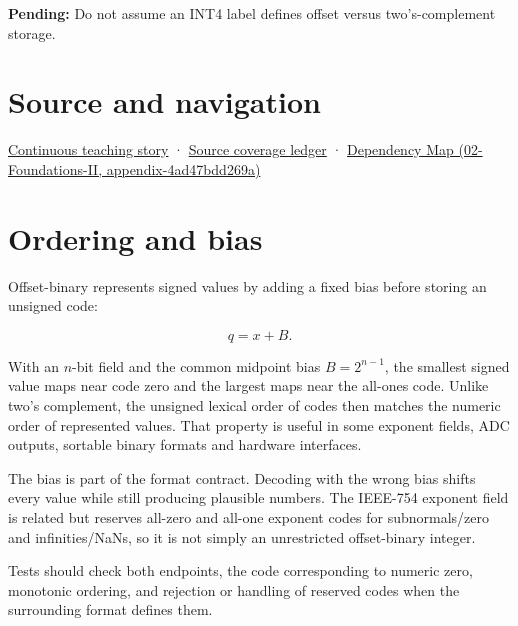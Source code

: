 \textbf{Pending:} Do not assume an INT4 label defines offset versus two's-complement storage.

\section{Source and navigation}\label{appendix-53a8cfb25f8d-source-and-navigation}

\href{Continuous\%20Notes/Computing\%20Foundations\%20-\%20From\%20Bits\%20to\%20C++\%20and\%20Systems\%20APIs\#Choosing\%20what\%20information\%20to\%20keep}{Continuous teaching story} · \hyperref[appendix-fd090d982a15]{Source coverage ledger} · \href{../02-Foundations-II/main.pdf\#nameddest=appendix-4ad47bdd269a}{Dependency Map (02-Foundations-II, appendix-4ad47bdd269a)}

\section{Ordering and bias}\label{appendix-53a8cfb25f8d-ordering-and-bias}

Offset-binary represents signed values by adding a fixed bias before storing an unsigned code:

\[q=x+B.\]

With an \(n\)-bit field and the common midpoint bias \(B=2^{n-1}\), the smallest signed value maps near code zero and the largest maps near the all-ones code. Unlike two's complement, the unsigned lexical order of codes then matches the numeric order of represented values. That property is useful in some exponent fields, ADC outputs, sortable binary formats and hardware interfaces.

The bias is part of the format contract. Decoding with the wrong bias shifts every value while still producing plausible numbers. The IEEE-754 exponent field is related but reserves all-zero and all-one exponent codes for subnormals/zero and infinities/NaNs, so it is not simply an unrestricted offset-binary integer.

Tests should check both endpoints, the code corresponding to numeric zero, monotonic ordering, and rejection or handling of reserved codes when the surrounding format defines them.
